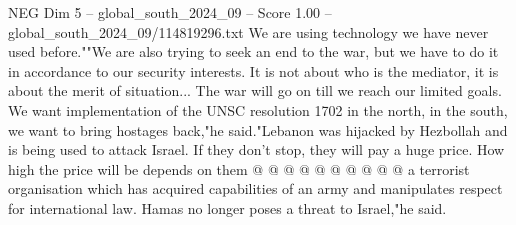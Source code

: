 \begin{textsample}{NEG Dim 5 – global\_south\_2024\_09 – Score 1.00 – global\_south\_2024\_09/114819296.txt}
We are using technology we have never used before.""We are also trying to seek an end to the war, but we have to do it in accordance to our security interests.
It is not about who is the mediator, it is about the merit of situation...
The war will go on till we reach our limited goals.
We want implementation of the UNSC resolution 1702 in the north, in the south, we want to bring hostages back,"he said."Lebanon was hijacked by Hezbollah and is being used to attack Israel.
If they don't stop, they will pay a huge price.
How high the price will be depends on them @ @ @ @ @ @ @ @ @ @ a terrorist organisation which has acquired capabilities of an army and manipulates respect for international law.
Hamas no longer poses a threat to Israel,"he said.

\end{textsample}
